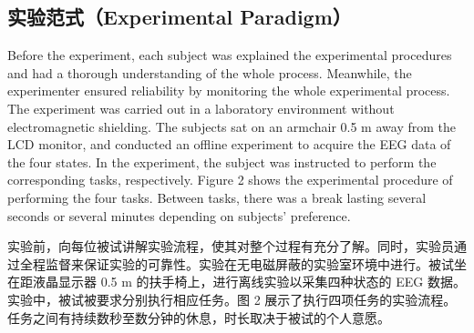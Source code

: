 \documentclass[11pt]{ctexart}
\newenvironment{en}{\begin{enbox}\color{black!85}}{\end{enbox}}
\newenvironment{zh}{\begin{zhbox}}{\end{zhbox}}
\begin{document}
\subsection{实验范式（Experimental Paradigm）}
\begin{en}
Before the experiment, each subject was explained the experimental procedures and had a thorough understanding of the whole process. Meanwhile, the experimenter ensured reliability by monitoring the whole experimental process. The experiment was carried out in a laboratory environment without electromagnetic shielding. The subjects sat on an armchair 0.5 m away from the LCD monitor, and conducted an offline experiment to acquire the EEG data of the four states. In the experiment, the subject was instructed to perform the corresponding tasks, respectively. Figure 2 shows the experimental procedure of performing the four tasks. Between tasks, there was a break lasting several seconds or several minutes depending on subjects' preference.
\end{en}
\begin{zh}
实验前，向每位被试讲解实验流程，使其对整个过程有充分了解。同时，实验员通过全程监督来保证实验的可靠性。实验在无电磁屏蔽的实验室环境中进行。被试坐在距液晶显示器 0.5 m 的扶手椅上，进行离线实验以采集四种状态的 EEG 数据。实验中，被试被要求分别执行相应任务。图 2 展示了执行四项任务的实验流程。任务之间有持续数秒至数分钟的休息，时长取决于被试的个人意愿。
\end{zh}
\end{document}
